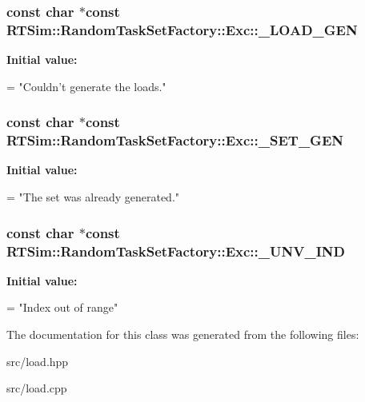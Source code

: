 \subsubsection[{\texorpdfstring{\+\_\+\+L\+O\+A\+D\+\_\+\+G\+EN}{_LOAD_GEN}}]{\setlength{\rightskip}{0pt plus 5cm}const char $\ast$const R\+T\+Sim\+::\+Random\+Task\+Set\+Factory\+::\+Exc\+::\+\_\+\+L\+O\+A\+D\+\_\+\+G\+EN\hspace{0.3cm}{\ttfamily [static]}}\hypertarget{classRTSim_1_1RandomTaskSetFactory_1_1Exc_a51e711b7bbbe17d7beb598c9cf2ec1a8}{}\label{classRTSim_1_1RandomTaskSetFactory_1_1Exc_a51e711b7bbbe17d7beb598c9cf2ec1a8}
{\bfseries Initial value\+:}
\begin{DoxyCode}
=
        \textcolor{stringliteral}{"Couldn't generate the loads."}
\end{DoxyCode}
\subsubsection[{\texorpdfstring{\+\_\+\+S\+E\+T\+\_\+\+G\+EN}{_SET_GEN}}]{\setlength{\rightskip}{0pt plus 5cm}const char $\ast$const R\+T\+Sim\+::\+Random\+Task\+Set\+Factory\+::\+Exc\+::\+\_\+\+S\+E\+T\+\_\+\+G\+EN\hspace{0.3cm}{\ttfamily [static]}}\hypertarget{classRTSim_1_1RandomTaskSetFactory_1_1Exc_a8fa6415c456f868f97dd9b6259f381d9}{}\label{classRTSim_1_1RandomTaskSetFactory_1_1Exc_a8fa6415c456f868f97dd9b6259f381d9}
{\bfseries Initial value\+:}
\begin{DoxyCode}
=
        \textcolor{stringliteral}{"The set was already generated."}
\end{DoxyCode}
\subsubsection[{\texorpdfstring{\+\_\+\+U\+N\+V\+\_\+\+I\+ND}{_UNV_IND}}]{\setlength{\rightskip}{0pt plus 5cm}const char $\ast$const R\+T\+Sim\+::\+Random\+Task\+Set\+Factory\+::\+Exc\+::\+\_\+\+U\+N\+V\+\_\+\+I\+ND\hspace{0.3cm}{\ttfamily [static]}}\hypertarget{classRTSim_1_1RandomTaskSetFactory_1_1Exc_af876b1f9203cef06d121159240df2b24}{}\label{classRTSim_1_1RandomTaskSetFactory_1_1Exc_af876b1f9203cef06d121159240df2b24}
{\bfseries Initial value\+:}
\begin{DoxyCode}
=
        \textcolor{stringliteral}{"Index out of range"}
\end{DoxyCode}


The documentation for this class was generated from the following files\+:\begin{DoxyCompactItemize}
\item 
src/load.\+hpp\item 
src/load.\+cpp\end{DoxyCompactItemize}

